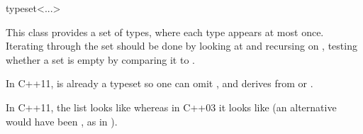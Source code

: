 \begin{ccRefClass}{typeset<...>}

\ccDefinition
This class provides a set of types, where each type appears at most once. Iterating through the set should be done by looking at  and recursing on , testing whether a set is empty by comparing it to .


In C++11,  is already a typeset so one can omit , and  derives from  or .

\ccImplementation
In C++11, the list looks like  whereas in C++03 it looks like  (an alternative would have been , as in ).

\end{ccRefClass}

